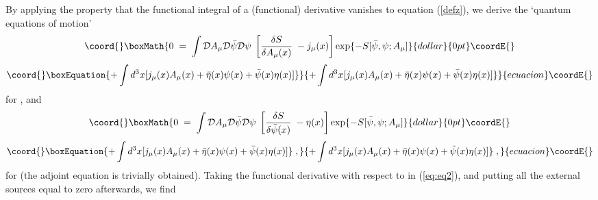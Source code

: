 \documentclass[a4paper,12pt]{article}
\begin{document}
By applying the property that the functional integral of a
(functional) derivative vanishes to equation (\ref{defz}), we derive
the `quantum equations of motion'
$$\coord{}\boxMath{
0\;=\;\int {\mathcal D}A_\mu {\mathcal D}{\bar \psi} {\mathcal
  D}\psi \; \left[\frac{\delta S}{\delta A_\mu(x)}\; - j_\mu (x)
\right] \exp \{ - S[{\bar\psi},\psi; A_\mu]
}{dollar}{0pt}\coordE{}$$
\begin{equation}\coord{}\boxEquation{
   \label{eq:eq1}
+ \int d^3x [j_\mu(x) A_\mu (x) + {\bar\eta}(x)\psi(x) +
{\bar\psi}(x)\eta(x)] \}
}{
   + \int d^3x [j_\mu(x) A_\mu (x) + {\bar\eta}(x)\psi(x) +
{\bar\psi}(x)\eta(x)] \}
}{ecuacion}\coordE{}\end{equation}
for \coordHE{}, and
$$\coord{}\boxMath{
0\;=\;\int {\mathcal D}A_\mu {\mathcal D}{\bar \psi} {\mathcal
  D}\psi \; \left[\frac{\delta S}{\delta {\bar \psi}(x)}\; - \eta(x)
\right] \exp \{ - S[{\bar\psi},\psi; A_\mu]
}{dollar}{0pt}\coordE{}$$
\begin{equation}\coord{}\boxEquation{
   \label{eq:eq2}
+ \int d^3x [ j_\mu(x) A_\mu (x) + {\bar\eta}(x)\psi(x) +
{\bar\psi}(x)\eta(x) ] \} \;,
}{
   + \int d^3x [ j_\mu(x) A_\mu (x) + {\bar\eta}(x)\psi(x) +
{\bar\psi}(x)\eta(x) ] \} \;,
}{ecuacion}\coordE{}\end{equation}
for \myHighlight{${\bar\psi}$}\coordHE{} (the adjoint equation is trivially obtained).  Taking
the functional derivative with respect to \coordHE{} in (\ref{eq:eq2}),
and putting all the external sources equal to zero afterwards, we find
\end{document}

